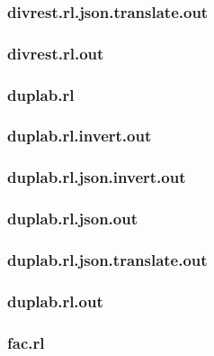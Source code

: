 \subsubsection{divrest.rl.json.translate.out}
\label{app:divrest_rl.json.translate.out}

\subsubsection{divrest.rl.out}
\label{app:divrest_rl.out}

\subsubsection{duplab.rl}
\label{app:duplab_rl}

\subsubsection{duplab.rl.invert.out}
\label{app:duplab_rl.invert.out}

\subsubsection{duplab.rl.json.invert.out}
\label{app:duplab_rl.json.invert.out}

\subsubsection{duplab.rl.json.out}
\label{app:duplab_rl.json.out}

\subsubsection{duplab.rl.json.translate.out}
\label{app:duplab_rl.json.translate.out}

\subsubsection{duplab.rl.out}
\label{app:duplab_rl.out}

\subsubsection{fac.rl}
\label{app:fac_rl}


